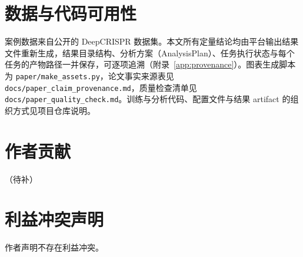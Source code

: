 \section*{数据与代码可用性}

案例数据来自公开的 DeepCRISPR 数据集\citep{Chuai2018GenomeBiol}。本文所有定量结论均由平台输出结果文件重新生成，结果目录结构、分析方案（AnalysisPlan）、任务执行状态与每个任务的产物路径一并保存，可逐项追溯（附录~\ref{app:provenance}）。图表生成脚本为 \texttt{paper/make\_assets.py}，论文事实来源表见 \texttt{docs/paper\_claim\_provenance.md}，质量检查清单见 \texttt{docs/paper\_quality\_check.md}。训练与分析代码、配置文件与结果 artifact 的组织方式见项目仓库说明。

\section*{作者贡献}
（待补）

\section*{利益冲突声明}
作者声明不存在利益冲突。
